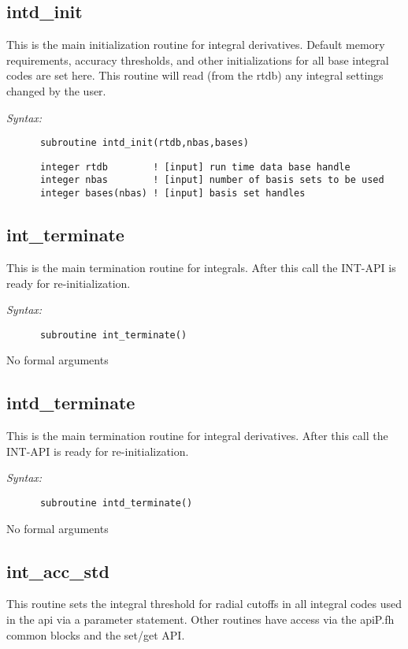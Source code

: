 \subsection{intd\_init} 
This is the main initialization routine for integral derivatives. 
Default memory requirements, accuracy thresholds, and other  
initializations for all base integral codes are set here.  
This routine will read (from the rtdb) any integral  
settings changed by the user. 
 
{\it Syntax:} 
\begin{verbatim} 
      subroutine intd_init(rtdb,nbas,bases) 
\end{verbatim} 
\begin{verbatim} 
      integer rtdb        ! [input] run time data base handle 
      integer nbas        ! [input] number of basis sets to be used 
      integer bases(nbas) ! [input] basis set handles 
\end{verbatim} 
 
\subsection{int\_terminate} 
This is the main termination routine for integrals. 
After this call the INT-API is ready for re-initialization. 
 
{\it Syntax:} 
\begin{verbatim} 
      subroutine int_terminate() 
\end{verbatim} 
No formal arguments 
 
 
\subsection{intd\_terminate} 
This is the main termination routine for integral 
derivatives. 
After this call the INT-API is ready for re-initialization. 
 
{\it Syntax:} 
\begin{verbatim} 
      subroutine intd_terminate() 
\end{verbatim} 
No formal arguments 
 
\subsection{int\_acc\_std} 
This routine sets the integral threshold for radial cutoffs in all  
integral codes used in the api via a parameter statement.  Other 
routines have access via the apiP.fh common blocks and the set/get API. 
 
